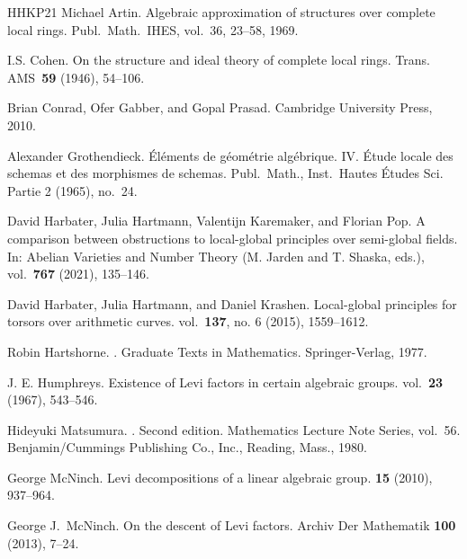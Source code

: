 \documentclass[12pt]{amsart}
\theoremstyle{plain}
\theoremstyle{definition}
\theoremstyle{remark}
\begin{document}
\begin{thebibliography}{HHKP21}
Michael Artin.
\newblock Algebraic approximation of structures over complete local rings.
\newblock  Publ.\ Math.\ IHES, vol.~36, 23--58, 1969.

I.S. Cohen.
\newblock On the structure and ideal theory of complete local rings.
\newblock Trans. AMS~{\bf 59} (1946), 54--106.

Brian Conrad, Ofer Gabber, and Gopal Prasad.
\newblock Cambridge University Press, 2010.

Alexander Grothendieck.
\newblock \'El\'ements de g\'eom\'etrie alg\'ebrique. IV. \'Etude locale des schemas et des morphismes de schemas.
\newblock Publ.\ Math., Inst.\ Hautes \'Etudes Sci.  
Partie 2 (1965), no.~24. 

David Harbater, Julia Hartmann, Valentijn Karemaker, and Florian Pop.
\newblock A comparison between obstructions to local-global principles over 
   semi-global fields.
\newblock    In: Abelian Varieties and Number Theory (M. Jarden and T. Shaska, eds.),    
\newblock vol.~{\bf 767} (2021), 135--146.

David Harbater, Julia Hartmann, and Daniel Krashen.
\newblock Local-global principles for torsors over arithmetic curves.
\newblock vol.~{\bf 137}, no. 6 (2015), 1559--1612.

Robin Hartshorne.
.
\newblock Graduate Texts in Mathematics.
\newblock Springer-Verlag, 1977.

J. E. Humphreys. 
\newblock Existence of Levi factors in certain algebraic groups.
\newblock vol.~{\bf 23} (1967), 543--546.

Hideyuki Matsumura. 
. Second edition. Mathematics Lecture Note Series, vol.~56. 
\newblock Benjamin/Cummings Publishing Co., Inc., Reading, Mass., 1980.


George  McNinch. 
\newblock Levi decompositions of a linear algebraic group. 
 {\bf 15} (2010), 937--964.

George J.\ McNinch.
\newblock On the descent of Levi factors.
\newblock Archiv Der Mathematik {\bf 100} (2013), 7--24.


\end{thebibliography}
\end{document}
